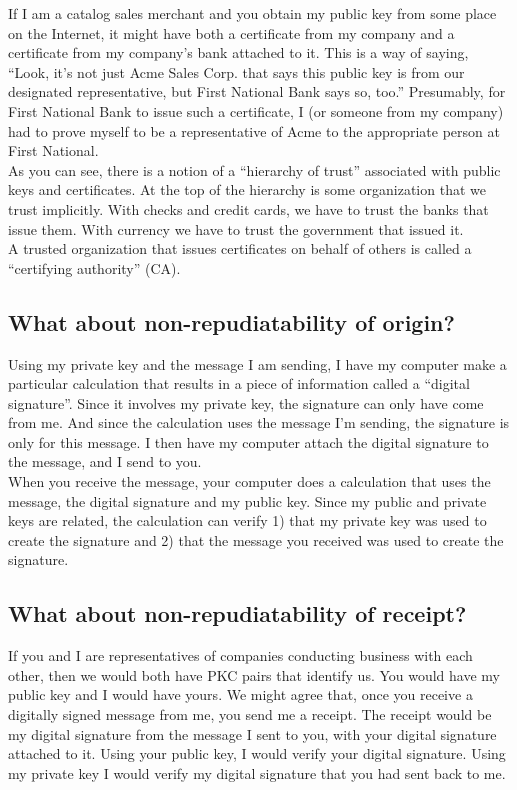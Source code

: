 If I am a catalog sales merchant and you obtain my public key from some
place on the Internet, it might have both a certificate from my company
and a certificate from my company's bank attached to it. This is a way
of saying, ``Look, it's not just Acme Sales Corp. that says this public
key is from our designated representative, but First National Bank says
so, too.'' Presumably, for First National Bank to issue such a
certificate, I (or someone from my company) had to prove myself to be a
representative of Acme to the appropriate person at First National.\\

As you can see, there is a notion of a ``hierarchy of trust''
associated with public keys and certificates. At the top of the
hierarchy is some organization that we trust implicitly. With checks
and credit cards, we have to trust the banks that issue them. With
currency we have to trust the government that issued it.\\

A trusted organization that issues certificates on behalf of others is
called a ``certifying authority'' (CA).


\subsection{What about non-repudiatability of origin?}
Using my private key and the message I am sending, I have my computer
make a particular calculation that results in a piece of information
called a ``digital signature''. Since it involves my private key, the
signature can only have come from me. And since the calculation uses
the message I'm sending, the signature is only for this message. I then
have my computer attach the digital signature to the message, and I
send to you.\\

When you receive the message, your computer does a calculation that
uses the message, the digital signature and my public key. Since my
public and private keys are related, the calculation can verify 1) that
my private key was used to create the signature and 2) that the message
you received was used to create the signature.


\subsection{What about non-repudiatability of receipt?}
If you and I are representatives of companies conducting business with
each other, then we would both have PKC pairs that identify us. You
would have my public key and I would have yours. We might agree that,
once you receive a digitally signed message from me, you send me a
receipt. The receipt would be my digital signature from the message I
sent to you, with your digital signature attached to it. Using your
public key, I would verify your digital signature. Using my private key
I would verify my digital signature that you had sent back to me.\\

